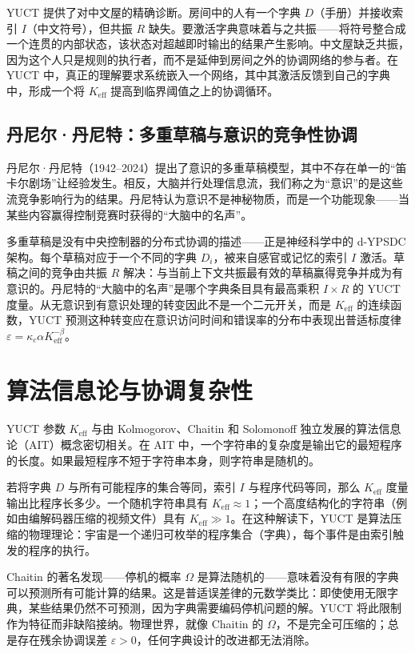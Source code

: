 \documentclass[12pt,a4paper]{article}
\begin{document}
	YUCT 提供了对中文屋的精确诊断。房间中的人有一个字典 \(D\)（手册）并接收索引 \(I\)（中文符号），但共振 \(R\) 缺失。要激活字典意味着与之共振——将符号整合成一个连贯的内部状态，该状态对超越即时输出的结果产生影响。中文屋缺乏共振，因为这个人只是规则的执行者，而不是延伸到房间之外的协调网络的参与者。在 YUCT 中，真正的理解要求系统嵌入一个网络，其中其激活反馈到自己的字典中，形成一个将 \(K_{\mathrm{eff}}\) 提高到临界阈值之上的协调循环。
	
	\subsection{丹尼尔·丹尼特：多重草稿与意识的竞争性协调}
	
	丹尼尔·丹尼特（1942–2024）提出了意识的多重草稿模型，其中不存在单一的“笛卡尔剧场”让经验发生。相反，大脑并行处理信息流，我们称之为“意识”的是这些流竞争影响行为的结果。丹尼特认为意识不是神秘物质，而是一个功能现象——当某些内容赢得控制竞赛时获得的“大脑中的名声”。
	
	多重草稿是没有中央控制器的分布式协调的描述——正是神经科学中的 d-YPSDC 架构。每个草稿对应于一个不同的字典 \(D_i\)，被来自感官或记忆的索引 \(I\) 激活。草稿之间的竞争由共振 \(R\) 解决：与当前上下文共振最有效的草稿赢得竞争并成为有意识的。丹尼特的“大脑中的名声”是哪个字典条目具有最高乘积 \(I \times R\) 的 YUCT 度量。从无意识到有意识处理的转变因此不是一个二元开关，而是 \(K_{\mathrm{eff}}\) 的连续函数，YUCT 预测这种转变应在意识访问时间和错误率的分布中表现出普适标度律 \(\varepsilon = \kappa_c \alpha K_{\mathrm{eff}}^{-\beta}\)。
	
	\section{算法信息论与协调复杂性}
	
	YUCT 参数 \(K_{\mathrm{eff}}\) 与由 Kolmogorov、Chaitin 和 Solomonoff 独立发展的算法信息论（AIT）概念密切相关。在 AIT 中，一个字符串的复杂度是输出它的最短程序的长度。如果最短程序不短于字符串本身，则字符串是随机的。
	
	若将字典 \(D\) 与所有可能程序的集合等同，索引 \(I\) 与程序代码等同，那么 \(K_{\mathrm{eff}}\) 度量输出比程序长多少。一个随机字符串具有 \(K_{\mathrm{eff}} \approx 1\)；一个高度结构化的字符串（例如由编解码器压缩的视频文件）具有 \(K_{\mathrm{eff}} \gg 1\)。在这种解读下，YUCT 是算法压缩的物理理论：宇宙是一个递归可枚举的程序集合（字典），每个事件是由索引触发的程序的执行。
	
	Chaitin 的著名发现——停机的概率 \(\Omega\) 是算法随机的——意味着没有有限的字典可以预测所有可能计算的结果。这是普适误差律的元数学类比：即使使用无限字典，某些结果仍然不可预测，因为字典需要编码停机问题的解。YUCT 将此限制作为特征而非缺陷接纳。物理世界，就像 Chaitin 的 \(\Omega\)，不是完全可压缩的；总是存在残余协调误差 \(\varepsilon > 0\)，任何字典设计的改进都无法消除。
	
\end{document}
